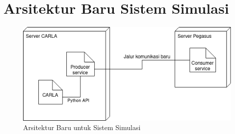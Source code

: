 \chapter{Arsitektur Baru Sistem Simulasi}\label{appendix-arsitektur-baru}
\begin{figure}[ht]
	\centering
	\includegraphics[width=1.0\textwidth]{resources/appendix-1-deployment diagram.png}
	\caption{Arsitektur Baru untuk Sistem Simulasi}
\end{figure}